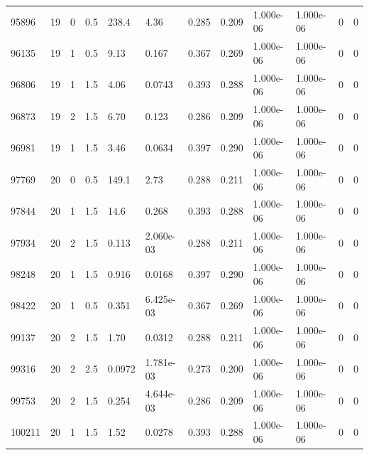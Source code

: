 \documentclass[preview]{standalone}
\begin{document}
{{{{\begin{tabular}{L{1.2cm}C{1.2cm} C{0.3cm}C{0.5cm} C{1.4cm}C{1.4cm} C{1.4cm}C{1.4cm} C{1.6cm}C{1.6cm} C{1.6cm}C{1.6cm}}
  95896  &    19  & 0     & 0.5 &  238.4  & 4.36  &  0.285&   0.209& 1.000e-06 & 1.000e-06   &  0 & 0  \\ 
  96135  &    19  & 1     & 0.5 &  9.13  & 0.167  &  0.367&   0.269& 1.000e-06 & 1.000e-06   &  0 & 0  \\ 
  96806  &    19  & 1     & 1.5 &  4.06  & 0.0743  &  0.393&   0.288& 1.000e-06 & 1.000e-06   &  0 & 0  \\ 
  96873  &    19  & 2     & 1.5 &  6.70  & 0.123  &  0.286&   0.209& 1.000e-06 & 1.000e-06   &  0 & 0  \\ 
  96981  &    19  & 1     & 1.5 &  3.46  & 0.0634  &  0.397&   0.290& 1.000e-06 & 1.000e-06   &  0 & 0  \\ 
  97769  &    20  & 0     & 0.5 &  149.1  & 2.73  &  0.288&   0.211& 1.000e-06 & 1.000e-06   &  0 & 0  \\ 
  97844  &    20  & 1     & 1.5 &  14.6  & 0.268  &  0.393&   0.288& 1.000e-06 & 1.000e-06   &  0 & 0  \\ 
  97934  &    20  & 2     & 1.5 &  0.113  & 2.060e-03  &  0.288&   0.211& 1.000e-06 & 1.000e-06   &  0 & 0  \\ 
  98248  &    20  & 1     & 1.5 &  0.916  & 0.0168  &  0.397&   0.290& 1.000e-06 & 1.000e-06   &  0 & 0  \\ 
  98422  &    20  & 1     & 0.5 &  0.351  & 6.425e-03  &  0.367&   0.269& 1.000e-06 & 1.000e-06   &  0 & 0  \\ 
  99137  &    20  & 2     & 1.5 &  1.70  & 0.0312  &  0.288&   0.211& 1.000e-06 & 1.000e-06   &  0 & 0  \\ 
  99316  &    20  & 2     & 2.5 &  0.0972  & 1.781e-03  &  0.273&   0.200& 1.000e-06 & 1.000e-06   &  0 & 0  \\ 
  99753  &    20  & 2     & 1.5 &  0.254  & 4.644e-03  &  0.286&   0.209& 1.000e-06 & 1.000e-06   &  0 & 0  \\ 
  100211  &    20  & 1     & 1.5 &  1.52  & 0.0278  &  0.393&   0.288& 1.000e-06 & 1.000e-06   &  0 & 0  \\ 
\hline 
\end{tabular} 

}}}}
\end{document}
